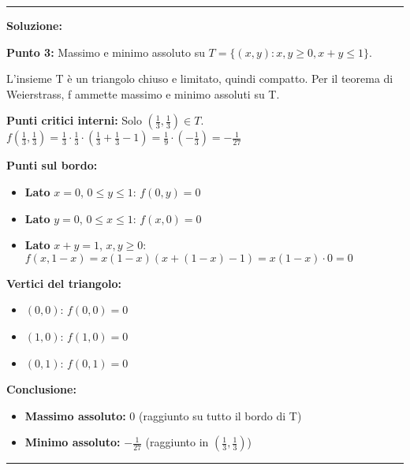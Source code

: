 \documentclass[12pt, a4paper]{article}
\newenvironment{solution}
{\par\noindent\rule{\textwidth}{0.4pt}\par\textbf{Soluzione:}\medskip\par}
{\par\rule{\textwidth}{0.4pt}\par\bigskip}
\begin{document}
\begin{solution}
\textbf{Punto 3:} Massimo e minimo assoluto su $T = \{(x,y) : x,y \geq 0, x+y \leq 1\}$.

L'insieme T è un triangolo chiuso e limitato, quindi compatto. Per il teorema di Weierstrass, f ammette massimo e minimo assoluti su T.

\textbf{Punti critici interni:} Solo $\left(\frac{1}{3}, \frac{1}{3}\right) \in T$.
$f\left(\frac{1}{3}, \frac{1}{3}\right) = \frac{1}{3} \cdot \frac{1}{3} \cdot \left(\frac{1}{3} + \frac{1}{3} - 1\right) = \frac{1}{9} \cdot \left(-\frac{1}{3}\right) = -\frac{1}{27}$

\textbf{Punti sul bordo:}
\begin{itemize}
\item \textbf{Lato} $x = 0$, $0 \leq y \leq 1$: $f(0,y) = 0$
\item \textbf{Lato} $y = 0$, $0 \leq x \leq 1$: $f(x,0) = 0$  
\item \textbf{Lato} $x + y = 1$, $x,y \geq 0$: $f(x,1-x) = x(1-x)(x + (1-x) - 1) = x(1-x) \cdot 0 = 0$
\end{itemize}

\textbf{Vertici del triangolo:}
\begin{itemize}
\item $(0,0)$: $f(0,0) = 0$
\item $(1,0)$: $f(1,0) = 0$
\item $(0,1)$: $f(0,1) = 0$
\end{itemize}

\textbf{Conclusione:}
\begin{itemize}
\item \textbf{Massimo assoluto:} $0$ (raggiunto su tutto il bordo di T)
\item \textbf{Minimo assoluto:} $-\frac{1}{27}$ (raggiunto in $\left(\frac{1}{3}, \frac{1}{3}\right)$)
\end{itemize}
\end{solution}
\end{document}

